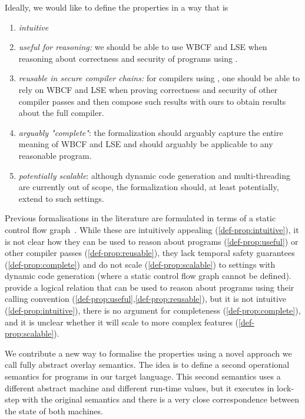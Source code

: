 \documentclass{jfp}
\begin{document}
Ideally, we would like to define the properties in a way that is
\begin{enumerate}
\item {\itshape intuitive} \label{def-prop:intuitive}
\item {\itshape useful for reasoning:} we should be able to use WBCF and LSE when reasoning about correctness and security of programs using \stktokens{}. \label{def-prop:useful}
\item {\itshape reusable in secure compiler chains:} for compilers using \stktokens{}, one should be able to rely on WBCF and LSE when proving correctness and security of other compiler passes and then compose such results with ours to obtain results about the full compiler.\label{def-prop:reusable}
\item {\itshape arguably "complete"}: the formalization should arguably capture the entire meaning of WBCF and LSE and should arguably be applicable to any reasonable program. \label{def-prop:complete}
\item {\itshape potentially scalable}: although dynamic code generation and multi-threading are currently out of scope, the formalization should, at least potentially, extend to such settings.\label{def-prop:scalable}
\end{enumerate}

Previous formalisations in the literature are formulated in terms of a static control flow graph~\cite[e.g., ][]{Abadi2005Theory}.
While these are intuitively appealing (\ref{def-prop:intuitive}), it is not clear how they can be used to reason about programs (\ref{def-prop:useful}) or other compiler passes (\ref{def-prop:reusable}), they lack temporal safety guarantees (\ref{def-prop:complete}) and do not scale (\ref{def-prop:scalable}) to settings with dynamic code generation (where a static control flow graph cannot be defined).
\citet{skorstengaard_reasoning_2017} provide a logical relation that
can be used to reason about programs using their calling convention
(\ref{def-prop:useful},\ref{def-prop:reusable}), but it is not intuitive (\ref{def-prop:intuitive}), there is no argument for completeness (\ref{def-prop:complete}), and it is unclear whether it will scale to more complex features (\ref{def-prop:scalable}).

We contribute a new way to formalise the properties using a novel approach we call fully abstract overlay semantics.
The idea is to define a second operational semantics for programs in our target language.
This second semantics uses a different abstract machine and different run-time values, but it executes in lock-step with the original semantics and there is a very close correspondence between the state of both machines.
\end{document}
